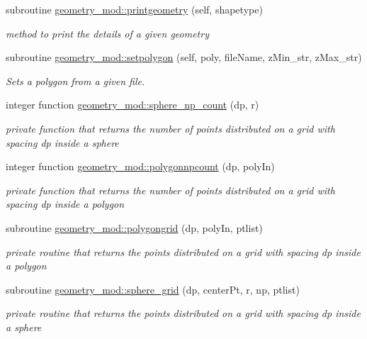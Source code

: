\begin{DoxyCompactItemize}
subroutine \mbox{\hyperlink{namespacegeometry__mod_aed4426181ca851b41717edd50268e5f3}{geometry\+\_\+mod\+::printgeometry}} (self, shapetype)
\begin{DoxyCompactList}\small\item\em method to print the details of a given geometry \end{DoxyCompactList}\item 
subroutine \mbox{\hyperlink{namespacegeometry__mod_a14008da67dcaf75e468b4487f0d96ef4}{geometry\+\_\+mod\+::setpolygon}} (self, poly, file\+Name, z\+Min\+\_\+str, z\+Max\+\_\+str)
\begin{DoxyCompactList}\small\item\em Sets a polygon from a given file. \end{DoxyCompactList}\item 
integer function \mbox{\hyperlink{namespacegeometry__mod_a05de7940b4e7df5a2b31f3d0414e3743}{geometry\+\_\+mod\+::sphere\+\_\+np\+\_\+count}} (dp, r)
\begin{DoxyCompactList}\small\item\em private function that returns the number of points distributed on a grid with spacing dp inside a sphere \end{DoxyCompactList}\item 
integer function \mbox{\hyperlink{namespacegeometry__mod_aaffceaeb22689f0aaee4568c662f192a}{geometry\+\_\+mod\+::polygonnpcount}} (dp, poly\+In)
\begin{DoxyCompactList}\small\item\em private function that returns the number of points distributed on a grid with spacing dp inside a polygon \end{DoxyCompactList}\item 
subroutine \mbox{\hyperlink{namespacegeometry__mod_a4862bb9e5bbc62fd581a34c4249b84d1}{geometry\+\_\+mod\+::polygongrid}} (dp, poly\+In, ptlist)
\begin{DoxyCompactList}\small\item\em private routine that returns the points distributed on a grid with spacing dp inside a polygon \end{DoxyCompactList}\item 
subroutine \mbox{\hyperlink{namespacegeometry__mod_a9b4ea4b26bc4f50dbfa3ba8b1d3fb2f2}{geometry\+\_\+mod\+::sphere\+\_\+grid}} (dp, center\+Pt, r, np, ptlist)
\begin{DoxyCompactList}\small\item\em private routine that returns the points distributed on a grid with spacing dp inside a sphere \end{DoxyCompactList}\item 

\end{DoxyCompactItemize}
